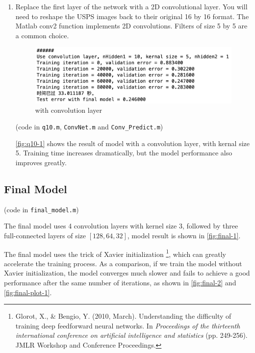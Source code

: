 \documentclass[10pt]{article}
\begin{document}
\begin{enumerate}
(code in \texttt{q9.m}, \texttt{data\_augmentation.m} and \texttt{visualize\_image.m})

I implemented data augmentation by applying small rotations and moves to the original images. An example is shown in \autoref{fig:digits} (from left to right: original, rotate $15^\circ$ anti-clockwise, rotate $15^\circ$ clockwise, move 2 pixels to the left, move 2 pixels to the right). 

Model result trained with data augmentation is shown in \autoref{fig:q9-1}. Surprisingly, there is no observable difference between augmented or not-augmented model. The reason may be that the task is relatively simple (with a small image), so the original data is enough for training.

\item Replace the first layer of the network with a 2D convolutional layer. You will need to reshape the USPS images back to their original 16 by 16 format. The Matlab conv2 function implements 2D convolutions. Filters of size 5 by 5 are a common choice.

\begin{figure}[htbp]
  \centering
  \includegraphics[width=0.5\linewidth]{figures/q10-1.png}
  \caption{with convolution layer}
  \label{fig:q10-1}
\end{figure}

(code in \texttt{q10.m}, \texttt{ConvNet.m} and \texttt{Conv\_Predict.m})

\autoref{fig:q10-1} shows the result of model with a convolution layer, with kernal size 5. Training time increases dramatically, but the model performance also improves greatly. 

\end{enumerate}

\subsection{Final Model}

(code in \texttt{final\_model.m})

The final model uses 4 convolution layers with kernel size 3, followed by three full-connected layers of size $[128, 64, 32]$, model result is shown in \autoref{fig:final-1}.

The final model uses the trick of Xavier initialization \footnote{Glorot, X., \& Bengio, Y. (2010, March). Understanding the difficulty of training deep feedforward neural networks. In \textit{Proceedings of the thirteenth international conference on artificial intelligence and statistics} (pp. 249-256). JMLR Workshop and Conference Proceedings.}, which can greatly accelerate the training process. As a comparison, if we train the model without Xavier initialization, the model converges much slower and fails to achieve a good performance after the same number of iterations, as shown in \autoref{fig:final-2} and \autoref{fig:final-plot-1}.
\end{document}
